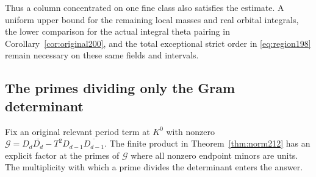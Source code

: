 \documentclass[a4paper,11pt]{article}
\theoremstyle{definition}
\theoremstyle{remark}
\numberwithin{equation}{section}
\begin{document}
Thus a column concentrated on one fine class also satisfies the
estimate. A uniform upper bound for the remaining local masses
and real orbital integrals, the lower comparison for the actual
integral theta pairing in Corollary~\ref{cor:original200}, and the
total exceptional strict order in \eqref{eq:region198} remain
necessary on these same fields and intervals.

\subsection{The primes dividing only the Gram determinant}\label{nav:IX-22}
Fix an original relevant period term at \(K^0\) with nonzero
\(\mathcal G=D_d\overline{D_d}-T^2D_{d-1}\overline{D_{d-1}}\).
The finite product in Theorem~\ref{thm:norm212} has an explicit
factor at the primes of \(\mathcal G\) where all nonzero endpoint
minors are units. The multiplicity with which a prime divides
the determinant enters the answer.
\end{document}
